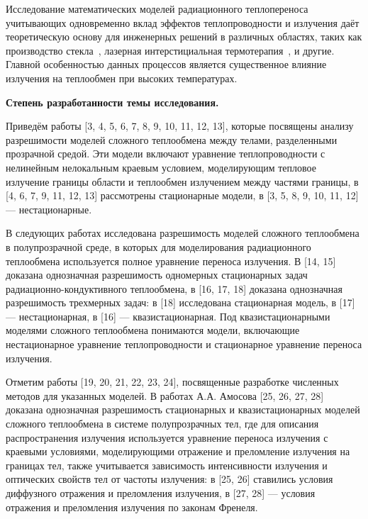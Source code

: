 Исследование математических моделей радиационного теплопереноса учитывающих одновременно
вклад эффектов теплопроводности и излучения даёт теоретическую основу для инженерных решений в различных областях,
таких как производство стекла~\cite{glass}, лазерная интерстициальная термотерапия~\cite{therapy}, и другие.
Главной особенностью данных процессов является существенное влияние излучения на теплообмен при высоких температурах.


\textbf{Степень разработанности темы исследования.}

Приведём работы [3, 4, 5, 6, 7, 8, 9, 10, 11, 12, 13], которые посвящены анализу разрешимости моделей сложного
теплообмена между телами, разделенными прозрачной средой.
Эти модели включают уравнение теплопроводности с нелинейным нелокальным краевым условием,
моделирующим тепловое излучение границы области и теплообмен излучением между частями границы,
в [4, 6, 7, 9, 11, 12, 13] рассмотрены стационарные модели, в [3, 5, 8, 9, 10, 11, 12] — нестационарные.

В следующих работах исследована разрешимость моделей сложного теплообмена в полупрозрачной среде,
в которых для моделирования радиационного теплообмена используется полное уравнение переноса излучения.
В [14, 15] доказана однозначная разрешимость одномерных стационарных задач радиационно-кондуктивного
теплообмена, в [16, 17, 18] доказана однозначная разрешимость трехмерных задач: в [18]
исследована стационарная модель, в [17] — нестационарная, в [16] — квазистационарная.
Под квазистационарными моделями сложного теплообмена понимаются модели, включающие нестационарное
уравнение теплопроводности и стационарное уравнение переноса излучения.

Отметим работы [19, 20, 21, 22, 23, 24], посвященные разработке численных методов для указанных моделей.
В работах А.А. Амосова [25, 26, 27, 28] доказана однозначная разрешимость стационарных и квазистационарных
моделей сложного теплообмена в системе полупрозрачных тел, где для описания распространения излучения используется
уравнение переноса излучения с краевыми условиями, моделирующими отражение и преломление излучения
на границах тел, также учитывается зависимость интенсивности излучения и оптических свойств тел от частоты
излучения: в [25, 26] ставились условия диффузного отражения и преломления излучения, в [27, 28] — условия отражения
и преломления излучения по законам Френеля.


